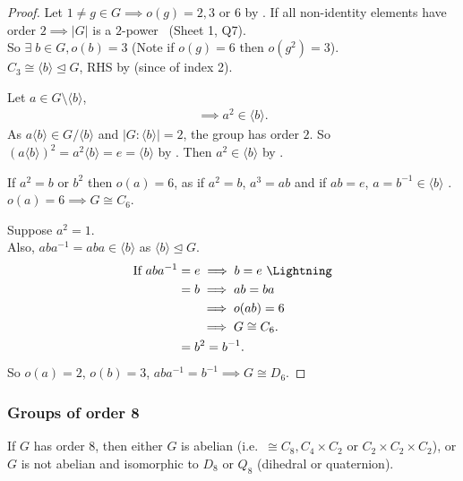 \begin{proof}
  Let $1 \neq g \in G \implies o(g) = 2, 3 \text{ or } 6$ by .
  If all non-identity elements have order $2 \implies |G|$ is a $2$-power \Lightning \ (Sheet 1, Q7). \\
  So $\exists \; b \in G, o(b) = 3$ (Note if $o(g) = 6$ then $o(g^2) = 3$). \\
  $C_3 \cong \langle b \rangle \trianglelefteq G$, RHS by  (since of index 2).

  Let $a \in G \setminus \langle b \rangle$,
  \begin{align*}
    \implies a^2 \in \langle b \rangle.
  \end{align*} 
  As $a \langle b \rangle \in G / \langle b \rangle$ and $|G : \langle b \rangle| = 2$, the group has order $2$. 
  So $(a \langle b \rangle)^2 = a^2 \langle b \rangle = e = \langle b \rangle$ by .
  Then $a^2 \in \langle b \rangle$ by .

  If $a^2 = b$ or $b^2$ then $o(a) = 6$, as if $a^2 = b$, $a^3 = ab$ and if $ab = e$, $a = b^{-1} \in \langle b \rangle$ \Lightning. \\
  $o(a) = 6 \implies G \cong C_6$. 

  Suppose $a^2 = 1$.\\
  Also, $a b a^{-1} = aba \in \langle b \rangle$ as $\langle b \rangle \trianglelefteq G$.
  \begin{align*}
    \text{If } aba^{-1} &= e\implies b = e \text{ \Lightning} \\
    &= b \implies ab = ba \\
    &\hspace{3.3ex}\ \implies o(ab) = 6 \\
    &\hspace{3.3ex}\ \implies G \cong C_6. \\
    &= b^2 = b^{-1}.
  \end{align*} 
  So $o(a) = 2$, $o(b) = 3$, $aba^{-1} = b^{-1} \implies G \cong D_6$.
\end{proof} 

\subsubsection{Groups of order 8}

\begin{lemma}
  If $G$ has order 8, then either $G$ is abelian (i.e.\ $\cong C_8, C_4\times C_2$ or $C_2\times C_2\times C_2$), or $G$ is not abelian and isomorphic to $D_8$ or $Q_8$ (dihedral or quaternion).
\end{lemma}


